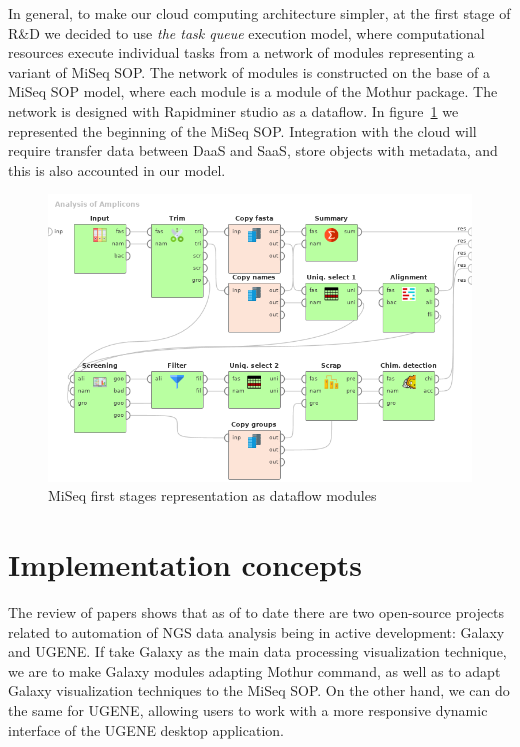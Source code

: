 \documentclass[a4paper]{jpconf}
\begin{document}
In general, to make our cloud computing architecture simpler, at the first stage of R\&D we decided to use \emph{the task queue} execution model, where computational resources execute individual tasks from a network of modules representing a variant of MiSeq SOP.  The network of modules is constructed on the base of a MiSeq SOP model, where each module is a module of the Mothur package.  The network is designed with Rapidminer studio as a dataflow. In figure~\ref{fig:mothur} we represented the beginning of the MiSeq SOP.  Integration with the cloud will require transfer data between DaaS and SaaS, store objects with metadata, and this is also accounted in our model.




\begin{figure}[bt]
  \centering
   \includegraphics[width=0.9\linewidth]{Dataflow-color-en.png}
  \caption{MiSeq first stages representation as dataflow modules \cite{cherk19}}
  \label{fig:mothur}
\end{figure}


\section{Implementation concepts}

The review of papers shows that as of to date there are two open-source projects related to automation of NGS data analysis being in active development: Galaxy and UGENE.  If take Galaxy as the main data processing visualization technique, we are to make Galaxy modules adapting Mothur command, as well as to adapt Galaxy visualization techniques to the MiSeq SOP.  On the other hand, we can do the same for UGENE, allowing users to work with a more responsive dynamic interface of the UGENE desktop application.
\end{document}
